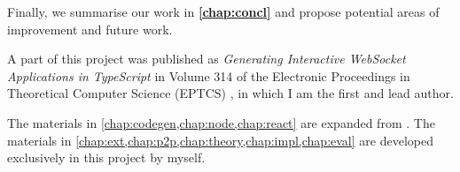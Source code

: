 Finally, we summarise our work in \textbf{\cref{chap:concl}} 
and propose potential
areas of improvement and future work.

\begin{remark}
A part of this project was published as 
\emph{Generating Interactive WebSocket 
Applications in TypeScript} in Volume 314 of the Electronic Proceedings
in Theoretical Computer Science (EPTCS) \cite{PLACES2020},
in which I am the first and lead author.

The materials in \cref{chap:codegen,chap:node,chap:react}
are expanded from \cite{PLACES2020}.
The materials in 
\cref{chap:ext,chap:p2p,chap:theory,chap:impl,chap:eval}
are developed exclusively in this project by myself.
\end{remark}